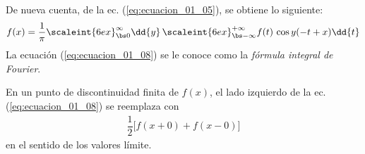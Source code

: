 De nueva cuenta, de la ec. (\ref{eq:ecuacion_01_05}), se obtiene lo siguiente:
\begin{align}
f(x) = \dfrac{1}{\pi} \scaleint{6ex}_{\bs 0}^{\infty}  \dd{y} \, \scaleint{6ex}_{\bs -\infty}^{+\infty} f(t) \, \cos y(-t + x) \dd{t} \label{eq:ecuacion_01_08}
\end{align}
La ecuación (\ref{eq:ecuacion_01_08}) se le conoce como la \emph{fórmula integral de Fourier}.
\par
En un punto de discontinuidad finita de $f(x)$, el lado izquierdo de la ec. (\ref{eq:ecuacion_01_08}) se reemplaza con
\begin{align*}
\dfrac{1}{2} \big[ f(x + 0) + f(x - 0) \big]
\end{align*}
en el sentido de los valores límite.

